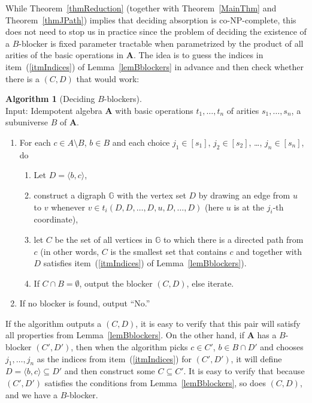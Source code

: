 \documentclass{amsart}
\theoremstyle{plain}
\theoremstyle{definition}
\newtheorem{algorithm}[theorem]{Algorithm}
\begin{document}
While Theorem~\ref{thmReduction} (together with Theorem~\ref{MainThm} and Theorem~\ref{thmJPath}) implies that deciding absorption is
co-{{\textsf{NP}}}-complete, this does not need to stop us in practice since the problem of
deciding the existence of a $B$-blocker is fixed parameter tractable when
parametrized by the product of all arities of the basic operations in ${{\mathbf{A}}}$. The idea is to
guess the indices in item~(\ref{itmIndices}) of Lemma~\ref{lemBblockers} in
advance and then check whether there is a $(C,D)$ that would work:

\begin{algorithm}[Deciding $B$-blockers]\label{algBblockers}\ \\
  Input: Idempotent algebra ${{\mathbf{A}}}$ with basic operations $t_1,\dots,t_n$ of arities
  $s_1,\dots, s_n$, a subuniverse $B$ of ${{\mathbf{A}}}$. 
  \begin{enumerate}
    \item For each $c\in A\setminus B$, $b\in B$ and each choice $j_1\in [s_1]$, $j_2\in
      [s_2]$, \dots, $j_n\in[s_n]$, do
      \begin{enumerate}
	\item Let $D=\langle b,c\rangle$,
	\item construct a digraph ${\mathbb{{G}}}$ with the vertex set $D$ by drawing an edge from
	  $u$ to $v$ whenever $v\in t_i(D,D,\dots,D,u,D,\dots,D)$
	  (here $u$ is at the $j_i$-th coordinate),
	\item let $C$ be the set of all vertices in ${\mathbb{{G}}}$ to which there is a
	  directed path from $c$ (in other words, $C$ is the smallest set
	  that contains $c$ and together with $D$ satisfies item~(\ref{itmIndices}) of
	  Lemma~\ref{lemBblockers}).
	\item If $C\cap B=\emptyset$, output the blocker $(C,D)$, else iterate.
      \end{enumerate}
    \item If no blocker is found, output ``No.''
  \end{enumerate}
\end{algorithm}
If the algorithm outputs a $(C,D)$, it is easy to verify that this pair 
will satisfy all properties from
Lemma~\ref{lemBblockers}. On the other hand, if ${{\mathbf{A}}}$ has  a
$B$-blocker $(C',D')$, then when the algorithm picks $c\in C'$, $b\in B\cap D'$ and chooses
$j_1,\dots,j_n$ as the indices from item~(\ref{itmIndices}) for $(C',D')$, it
will define $D = \langle b,c \rangle \subseteq D'$ and then construct some $C
\subseteq C'$. It is easy to verify that because $(C',D')$ satisfies the
conditions from Lemma~\ref{lemBblockers}, so does $(C,D)$, and we have a
$B$-blocker.
\end{document}
